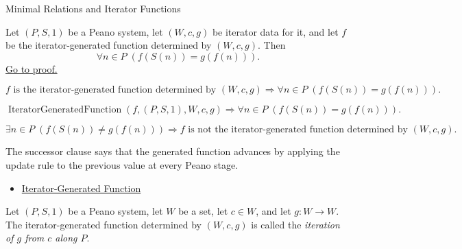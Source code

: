 \begin{topicbox}{Minimal Relations and Iterator Functions}
\begin{tcolorbox}[colback=thmbox, colframe=thmborder, arc=2pt,
  left=6pt, right=6pt, top=4pt, bottom=4pt,
  title={\small\textbf{Theorem (Iterator Successor Clause)}},
  fonttitle=\small\bfseries]
\begin{theorem}
\label{thm:iterator-successor-step}
Let $(P,S,1)$ be a Peano system, let $(W,c,g)$ be iterator data for it, and let
$f$ be the iterator-generated function determined by $(W,c,g)$. Then
\[
\forall n\in P\;(f(S(n))=g(f(n))).
\]
\hyperref[prf:iterator-successor-step]{Go to proof.}
\end{theorem}
\end{tcolorbox}

\begin{remark*}
\[
f \text{ is the iterator-generated function determined by } (W,c,g)
\Longrightarrow
\forall n\in P\;(f(S(n))=g(f(n))).
\]
\end{remark*}

\begin{remark*}
\[
\operatorname{IteratorGeneratedFunction}(f,(P,S,1),W,c,g)
\Longrightarrow
\forall n\in P\;(f(S(n))=g(f(n))).
\]
\end{remark*}

\begin{remark*}
\[
\exists n\in P\;(f(S(n))\neq g(f(n)))
\Longrightarrow
f \text{ is not the iterator-generated function determined by } (W,c,g).
\]
\end{remark*}

\begin{remark*}[Interpretation]
The successor clause says that the generated function advances by applying
the update rule to the previous value at every Peano stage.
\end{remark*}

\begin{dependencies}
\begin{itemize}
  \item \hyperref[def:iterator-generated-function]{Iterator-Generated Function}
\end{itemize}
\end{dependencies}

\begin{tcolorbox}[colback=defbox, colframe=defborder, arc=2pt,
  left=6pt, right=6pt, top=4pt, bottom=4pt,
  title={\small\textbf{Definition (Iteration of a Self-Map)}},
  fonttitle=\small\bfseries]
\begin{definition}
\label{def:iteration-of-a-self-map}
Let $(P,S,1)$ be a Peano system, let $W$ be a set, let $c\in W$, and let
$g:W\to W$. The iterator-generated function determined by $(W,c,g)$ is called
the \emph{iteration of $g$ from $c$ along $P$}.
\end{definition}
\end{tcolorbox}


\end{topicbox}
